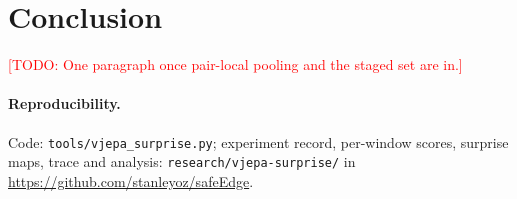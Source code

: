 \documentclass[11pt]{article}
\newcommand{\todo}[1]{\textcolor{red}{[TODO: #1]}}
\begin{document}
\section{Conclusion}
\todo{One paragraph once pair-local pooling and the staged set are in.}

\paragraph{Reproducibility.} Code: \texttt{tools/vjepa\_surprise.py};
experiment record, per-window scores, surprise maps, trace and analysis:
\texttt{research/vjepa-surprise/} in \url{https://github.com/stanleyoz/safeEdge}.



\end{document}
